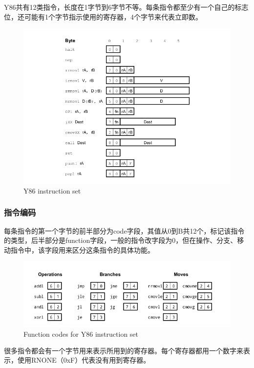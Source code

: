 Y86共有12类指令，长度在1字节到6字节不等。每条指令都至少有一个自己的标志位，还可能有1个字节指示使用的寄存器，4个字节来代表立即数。

\begin{figure}[htbp]
\centering
\includegraphics{img/isa.png}
\caption{Y86 instruction set}
\end{figure}

\subsubsection{指令编码}\label{ux6307ux4ee4ux7f16ux7801}

每条指令的第一个字节的前半部分为code字段，其值从0到B共12个，标记该指令的类型，后半部分是function字段，一般的指令改字段为0，但在操作、分支、移动指令中，该字段用来区分这条指令的具体功能。

\begin{figure}[htbp]
\centering
\includegraphics{img/icodes.png}
\caption{Function codes for Y86 instruction set}
\end{figure}

很多指令都会有一个字节用来表示所用到的寄存器。每个寄存器都用一个数字来表示，使用RNONE（0xF）代表没有用到寄存器。

